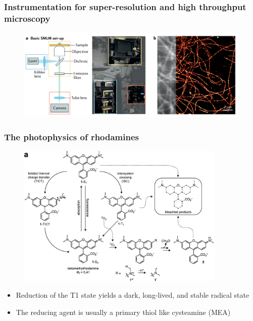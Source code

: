\documentclass{beamer}					%
\begin{document}
\begin{frame}
\frametitle{Instrumentation for super-resolution and high throughput microscopy}

\begin{figure}
\includegraphics[width=12cm]{Setup.png}
\end{figure}
  
\end{frame}

\begin{frame}
\frametitle{The photophysics of rhodamines}

\begin{figure}
\includegraphics[width=10cm]{Rhodamines.png}
\end{figure}
\begin{itemize}
\item  Reduction of the T1 state yields a dark, long-lived, and stable radical state
\item The reducing agent is usually a primary thiol like cysteamine (MEA)
\end{itemize}
\end{frame}
\end{document}
